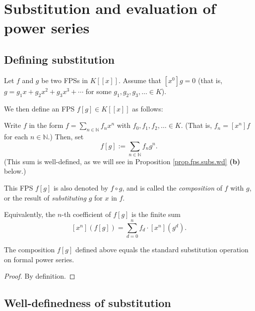 \section{Substitution and evaluation of power series}

\subsection{Defining substitution}

\begin{definition}
\label{def.fps.subs}
\leantarget
\leanok
Let $f$ and $g$ be two FPSs in $K[[x]]$. Assume that $[x^0]g = 0$
(that is, $g = g_1 x + g_2 x^2 + g_3 x^3 + \cdots$ for some
$g_1, g_2, g_3, \ldots \in K$).

We then define an FPS $f[g] \in K[[x]]$ as follows:

Write $f$ in the form $f = \sum_{n \in \mathbb{N}} f_n x^n$ with
$f_0, f_1, f_2, \ldots \in K$. (That is, $f_n = [x^n]f$ for each
$n \in \mathbb{N}$.) Then, set
\[
f[g] := \sum_{n \in \mathbb{N}} f_n g^n.
\]
(This sum is well-defined, as we will see in Proposition
\ref{prop.fps.subs.wd} \textbf{(b)} below.)

This FPS $f[g]$ is also denoted by $f \circ g$, and is called the
\emph{composition} of $f$ with $g$, or the result of \emph{substituting}
$g$ for $x$ in $f$.

Equivalently, the $n$-th coefficient of $f[g]$ is the finite sum
\[
[x^n](f[g]) = \sum_{d=0}^{n} f_d \cdot [x^n](g^d).
\]
\end{definition}

\begin{lemma}
\label{lem.fps.subs.eq-subst}
\leanhelper
\leanok
The composition $f[g]$ defined above equals the standard
substitution operation on formal power series.
\end{lemma}

\begin{proof}
\leanok
By definition.
\end{proof}

\subsection{Well-definedness of substitution}

